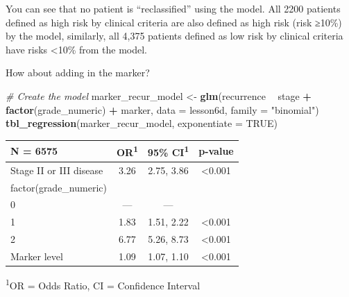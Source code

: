 \documentclass[]{book}
\newenvironment{Shaded}{\begin{snugshade}}{\end{snugshade}}
\newcommand{\CommentTok}[1]{\textcolor[rgb]{0.56,0.35,0.01}{\textit{#1}}}
\newcommand{\DataTypeTok}[1]{\textcolor[rgb]{0.13,0.29,0.53}{#1}}
\newcommand{\KeywordTok}[1]{\textcolor[rgb]{0.13,0.29,0.53}{\textbf{#1}}}
\newcommand{\NormalTok}[1]{#1}
\newcommand{\OperatorTok}[1]{\textcolor[rgb]{0.81,0.36,0.00}{\textbf{#1}}}
\newcommand{\OtherTok}[1]{\textcolor[rgb]{0.56,0.35,0.01}{#1}}
\newcommand{\StringTok}[1]{\textcolor[rgb]{0.31,0.60,0.02}{#1}}
\begin{document}
You can see that no patient is ``reclassified'' using the model. All 2200 patients defined as high risk by clinical criteria are also defined as high risk (risk ≥10\%) by the model, similarly, all 4,375 patients defined as low risk by clinical criteria have risks \textless10\% from the model.

How about adding in the marker?

\begin{Shaded}
\begin{Highlighting}[]
\CommentTok{# Create the model}
\NormalTok{marker_recur_model <-}\StringTok{ }\KeywordTok{glm}\NormalTok{(recurrence }\OperatorTok{~}\StringTok{ }\NormalTok{stage }\OperatorTok{+}\StringTok{ }\KeywordTok{factor}\NormalTok{(grade_numeric) }\OperatorTok{+}\StringTok{ }\NormalTok{marker,}
                          \DataTypeTok{data =}\NormalTok{ lesson6d,}
                          \DataTypeTok{family =} \StringTok{"binomial"}\NormalTok{)}
\KeywordTok{tbl_regression}\NormalTok{(marker_recur_model, }\DataTypeTok{exponentiate =} \OtherTok{TRUE}\NormalTok{)}
\end{Highlighting}
\end{Shaded}

\captionsetup[table]{labelformat=empty,skip=1pt}
\begin{longtable}{lccc}
\toprule
\textbf{N = 6575} & \textbf{OR}\textsuperscript{1} & \textbf{95\% CI}\textsuperscript{1} & \textbf{p-value} \\ 
\midrule
Stage II or III disease & 3.26 & 2.75, 3.86 & <0.001 \\ 
factor(grade\_numeric) &  &  &  \\ 
0 & --- & --- &  \\ 
1 & 1.83 & 1.51, 2.22 & <0.001 \\ 
2 & 6.77 & 5.26, 8.73 & <0.001 \\ 
Marker level & 1.09 & 1.07, 1.10 & <0.001 \\ 
\bottomrule
\end{longtable}
\vspace{-5mm}
\begin{minipage}{\linewidth}
\textsuperscript{1}OR = Odds Ratio, CI = Confidence Interval \\ 
\end{minipage}

\begin{Shaded}
\end{Shaded}
\end{document}

